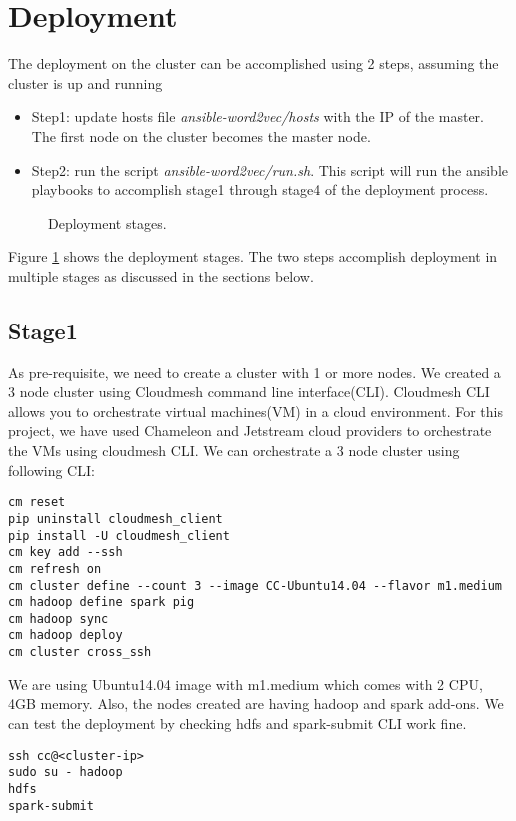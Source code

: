 \section{Deployment} \label{deploymentsection}

The deployment on the cluster can be accomplished using 2 steps, assuming the cluster
is up and running
\begin{itemize}[noitemsep]
\item Step1: update hosts file \textit{ansible-word2vec/hosts} with the IP of the master. 
The first node on the cluster becomes the master node.
\item Step2: run the script  \textit{ansible-word2vec/run.sh}. This script will run the ansible 
playbooks to accomplish stage1 through stage4 of the deployment process.
\end{itemize}

\begin{figure}[htbp]
\centering
{}
\caption{Deployment stages.}
\label{fig:deploymentstages}
\end{figure}

Figure \ref{fig:deploymentstages} shows the deployment stages. The two steps
accomplish deployment in multiple stages as discussed in the sections below.

\subsection{Stage1} \label{deploymentstage1} 
As pre-requisite, we need to create a cluster with 1 or more nodes.
We created a 3 node cluster using Cloudmesh \cite{www-cloudmesh} command line interface(CLI). 
Cloudmesh\cite{www-cloudmesh} CLI allows you to orchestrate virtual machines(VM) in a 
cloud environment. For this project, we have used Chameleon and Jetstream cloud 
providers to orchestrate the VMs using cloudmesh\cite{www-cloudmesh} CLI. We can orchestrate a 3 node 
cluster using following CLI:

\begin{verbatim}
cm reset
pip uninstall cloudmesh_client
pip install -U cloudmesh_client
cm key add --ssh
cm refresh on
cm cluster define --count 3 --image CC-Ubuntu14.04 --flavor m1.medium
cm hadoop define spark pig
cm hadoop sync
cm hadoop deploy
cm cluster cross_ssh
\end{verbatim}   

We are using Ubuntu14.04 image with m1.medium which comes with 2 CPU, 4GB
memory. Also, the nodes created are having hadoop and spark add-ons.
We can test the deployment by checking hdfs and spark-submit CLI work fine.
\begin{verbatim}
ssh cc@<cluster-ip>
sudo su - hadoop
hdfs
spark-submit
\end{verbatim}

